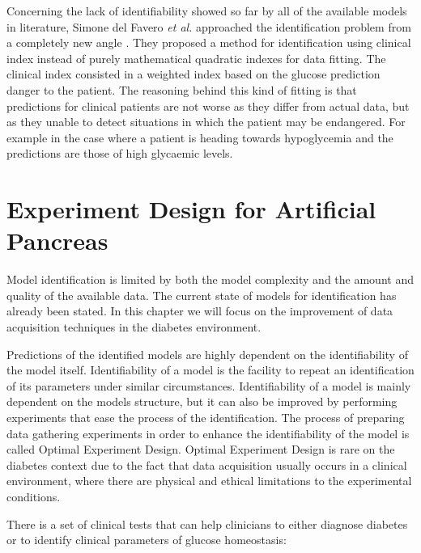 Concerning the lack of identifiability showed so far by all of the available models in literature, Simone del Favero \textit{et al.} approached the identification problem from a completely new angle \cite{del2012glucose}. They proposed a method for identification using clinical index instead of purely mathematical quadratic indexes for data fitting. The clinical index consisted in a weighted index based on the glucose prediction danger to the patient. The reasoning behind this kind of fitting is that predictions for clinical patients are not worse as they differ from actual data, but as they unable to detect situations in which the patient may be endangered. For example in the case where a patient is heading towards hypoglycemia and the predictions are those of high glycaemic levels.

\section{Experiment Design for Artificial Pancreas}
\label{sec:ExperimentDesign}

Model identification is limited by both the model complexity and the amount and quality of the available data. The current state of models for identification has already been stated. In this chapter we will focus on the improvement of data acquisition techniques in the diabetes environment.

Predictions of the identified models are highly dependent on the identifiability of the model itself. Identifiability of a model is the facility to repeat an identification of its parameters under similar circumstances. Identifiability of a model is mainly dependent on the models structure, but it can also be improved by performing experiments that ease the process of the identification. The process of preparing data gathering experiments in order to enhance the identifiability of the model is called Optimal Experiment Design. Optimal Experiment Design is rare on the diabetes context due to the fact that data acquisition usually occurs in a clinical environment, where there are physical and ethical limitations to the experimental conditions.

There is a set of clinical tests that can help clinicians to either diagnose diabetes or to identify clinical parameters of glucose homeostasis:

